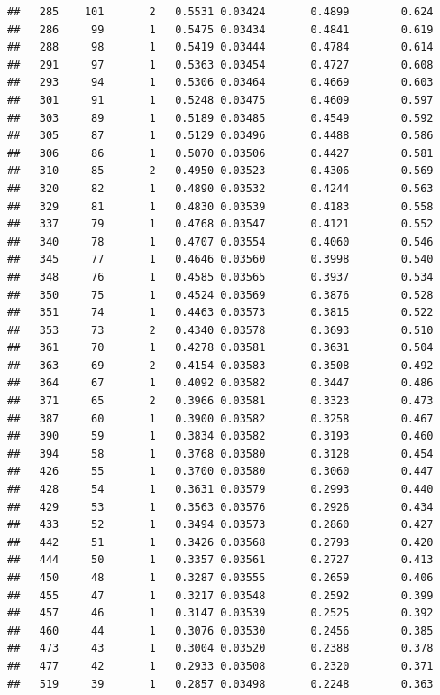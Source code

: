 \documentclass[
]{article}
\begin{document}
\begin{verbatim}
##   285    101       2   0.5531 0.03424       0.4899        0.624
##   286     99       1   0.5475 0.03434       0.4841        0.619
##   288     98       1   0.5419 0.03444       0.4784        0.614
##   291     97       1   0.5363 0.03454       0.4727        0.608
##   293     94       1   0.5306 0.03464       0.4669        0.603
##   301     91       1   0.5248 0.03475       0.4609        0.597
##   303     89       1   0.5189 0.03485       0.4549        0.592
##   305     87       1   0.5129 0.03496       0.4488        0.586
##   306     86       1   0.5070 0.03506       0.4427        0.581
##   310     85       2   0.4950 0.03523       0.4306        0.569
##   320     82       1   0.4890 0.03532       0.4244        0.563
##   329     81       1   0.4830 0.03539       0.4183        0.558
##   337     79       1   0.4768 0.03547       0.4121        0.552
##   340     78       1   0.4707 0.03554       0.4060        0.546
##   345     77       1   0.4646 0.03560       0.3998        0.540
##   348     76       1   0.4585 0.03565       0.3937        0.534
##   350     75       1   0.4524 0.03569       0.3876        0.528
##   351     74       1   0.4463 0.03573       0.3815        0.522
##   353     73       2   0.4340 0.03578       0.3693        0.510
##   361     70       1   0.4278 0.03581       0.3631        0.504
##   363     69       2   0.4154 0.03583       0.3508        0.492
##   364     67       1   0.4092 0.03582       0.3447        0.486
##   371     65       2   0.3966 0.03581       0.3323        0.473
##   387     60       1   0.3900 0.03582       0.3258        0.467
##   390     59       1   0.3834 0.03582       0.3193        0.460
##   394     58       1   0.3768 0.03580       0.3128        0.454
##   426     55       1   0.3700 0.03580       0.3060        0.447
##   428     54       1   0.3631 0.03579       0.2993        0.440
##   429     53       1   0.3563 0.03576       0.2926        0.434
##   433     52       1   0.3494 0.03573       0.2860        0.427
##   442     51       1   0.3426 0.03568       0.2793        0.420
##   444     50       1   0.3357 0.03561       0.2727        0.413
##   450     48       1   0.3287 0.03555       0.2659        0.406
##   455     47       1   0.3217 0.03548       0.2592        0.399
##   457     46       1   0.3147 0.03539       0.2525        0.392
##   460     44       1   0.3076 0.03530       0.2456        0.385
##   473     43       1   0.3004 0.03520       0.2388        0.378
##   477     42       1   0.2933 0.03508       0.2320        0.371
##   519     39       1   0.2857 0.03498       0.2248        0.363

\end{verbatim}
\end{document}
